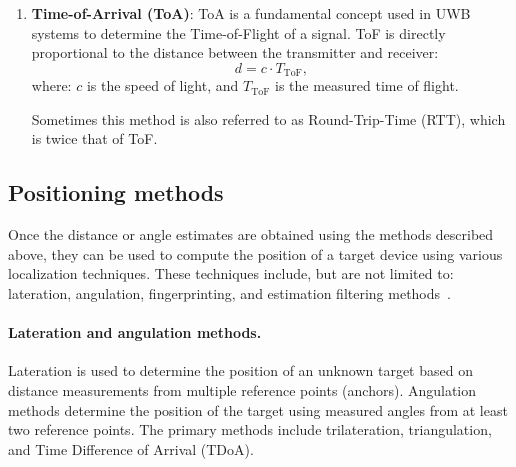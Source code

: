 \begin{enumerate}
    \item \textbf{Time-of-Arrival (ToA)}: ToA is a fundamental concept used in UWB systems to determine the Time-of-Flight of a signal. ToF is directly proportional to the distance between the transmitter and receiver:
    \begin{equation}
    d = c \cdot T_{\text{ToF}},
    \end{equation}
    where: $c$ is the speed of light, and $T_{\text{ToF}}$ is the measured time of flight.
    
    Sometimes this method is also referred to as Round-Trip-Time (RTT), which is twice that of ToF.
\end{enumerate}

\subsection{Positioning methods}
Once the distance or angle estimates are obtained using the methods described above, they can be used to compute the position of a target device using various localization techniques. These techniques include, but are not limited to: lateration, angulation, fingerprinting, and estimation filtering methods~\cite{qi2024current}.

\paragraph{Lateration and angulation methods.}
Lateration is used to determine the position of an unknown target based on distance measurements from multiple reference points (anchors). Angulation methods determine the position of the target using measured angles from at least two reference points.
The primary methods include trilateration, triangulation, and Time Difference of Arrival (TDoA).


